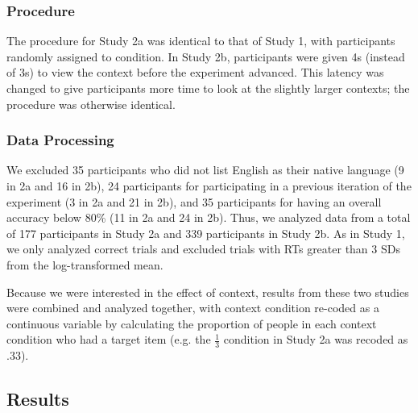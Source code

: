 \documentclass[10pt,letterpaper]{article}
\begin{document}
\subsubsection{Procedure}
 The procedure for Study 2a was identical to that of Study 1, with participants randomly assigned to condition.   In Study 2b, participants were given 4s (instead of 3s) to view the context before the experiment advanced.  This latency was changed to give participants more time to look at the slightly larger contexts; the procedure was otherwise identical.
 
 \subsubsection{Data Processing}
We excluded 35 participants who did not list English as their native language (9 in 2a and 16 in 2b), 24 participants for participating in a previous iteration of the experiment (3 in 2a and 21 in 2b), and 35 participants for having an overall accuracy below 80\% (11 in 2a and 24 in 2b).  Thus, we analyzed data from a total of 177 participants in Study 2a and 339 participants in Study 2b. As in Study 1, we only analyzed correct trials and excluded trials with RTs greater than 3 SDs from the log-transformed mean. 

Because we were interested in the effect of context, results from these two studies were combined and analyzed together, with context condition re-coded as a continuous variable by calculating the proportion of people in each context condition who had a target item (e.g. the $\frac{1}{3}$ condition in Study 2a was recoded as .33). 

\subsection{Results}
\end{document}

